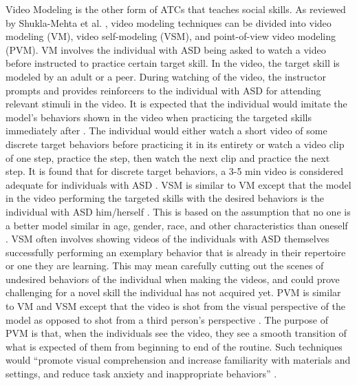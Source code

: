 Video Modeling is the other form of ATCs that teaches social skills.  As reviewed by Shukla-Mehta et al. \cite{shukla2009evaluating}, video modeling techniques can be divided into video modeling (VM), video self-modeling (VSM), and point-of-view video modeling (PVM).  VM involves the individual with ASD being asked to watch a video before instructed to practice certain target skill.  In the video, the target skill is modeled by an adult or a peer.  During watching of the video, the instructor prompts and provides reinforcers to the individual with ASD for attending relevant stimuli in the video.  It is expected that the individual would imitate the model's behaviors shown in the video when practicing the targeted skills immediately after \cite{bellini2007meta, graetz2006show}.  The individual would either watch a short video of some discrete target behaviors before practicing it in its entirety or watch a video clip of one step, practice the step, then watch the next clip and practice the next step.  It is found that for discrete target behaviors, a 3-5 min video is considered adequate for individuals with ASD \cite{buggey2005video}.  VSM is similar to VM except that the model in the video performing the targeted skills with the desired behaviors is the individual with ASD him/herself \cite{hitchcock2003video}.  This is based on the assumption that no one is a better model similar in age, gender, race, and other characteristics than oneself \cite{bandura1969principles, buggey1999training}.  VSM often involves showing videos of the individuals with ASD themselves successfully performing an exemplary behavior that is already in their repertoire or one they are learning.  This may mean carefully cutting out the scenes of undesired behaviors of the individual when making the videos, and could prove challenging for a novel skill the individual has not acquired yet.  PVM is similar to VM and VSM except that the video is shot from the visual perspective of the model as opposed to shot from a third person's perspective \cite{hine2006using}.  The purpose of PVM is that, when the individuals see the video, they see a smooth transition of what is expected of them from beginning to end of the routine.  Such techniques would ``promote visual comprehension and increase familiarity with materials and settings, and reduce task anxiety and inappropriate behaviors'' \cite{shukla2009evaluating}.

